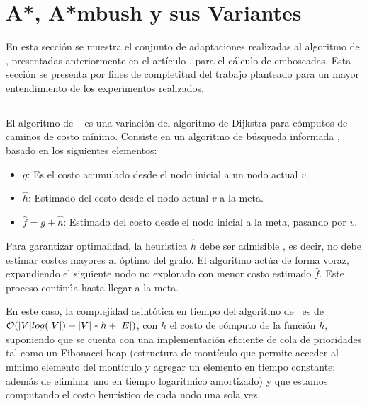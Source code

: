 \section{A*, A*mbush y sus Variantes}
\label{sec:ambush}

En esta secci\'on se muestra el conjunto de adaptaciones realizadas
al algoritmo de \astar, presentadas anteriormente en el art\'iculo
\cite{FGC12e}, para el c\'alculo de emboscadas. Esta secci\'on se
presenta por fines de completitud del trabajo planteado para un
mayor entendimiento de los experimentos realizados.

\subsection{\astar}

El algoritmo de \astar\ \cite{HNR72}\cite{RN93}\cite{MF09}
es una variación del algoritmo de Dijkstra \cite{CLRS09}
para cómputos de caminos de costo mínimo.
Consiste en un algoritmo de búsqueda informada \cite{RN93},
basado en los siguientes e\-le\-men\-tos:

\begin{itemize}
\item $g$: Es el costo acumulado desde el nodo inicial a un nodo actual $v$.
\item $\hat{h}$: Estimado del costo desde el nodo actual $v$ a la meta.
\item $\hat{f} = g + \hat{h}$: Estimado del costo desde el nodo inicial a la meta, pasando por $v$.
\end{itemize}

Para garantizar optimalidad, la heuristica $\hat{h}$ debe
ser admisible \cite{HNR72}, es decir, no debe estimar
costos mayores al óptimo del grafo.
El algoritmo actúa de forma voraz, expandiendo el 
si\-guien\-te nodo no explorado con menor costo estimado $\hat{f}$.
Este proceso continúa hasta llegar a la meta. 

En este caso, la complejidad asintótica en tiempo
del algoritmo de \astar\ es de $\mathcal{O}(|V|log(|V|) + |V|*h + |E|)$,
con $h$ el costo de cómputo de la función $\hat{h}$,
suponiendo que se cuenta con una implementación eficiente de
cola de prioridades tal como un Fibonacci heap \cite{CLRS09} (estructura
de montículo que permite acceder al mínimo elemento del montículo
y agregar un elemento en tiempo constante; además de
e\-li\-mi\-nar uno en tiempo logarítmico amortizado) y que estamos
computando el costo heurístico de cada nodo una sola vez.

